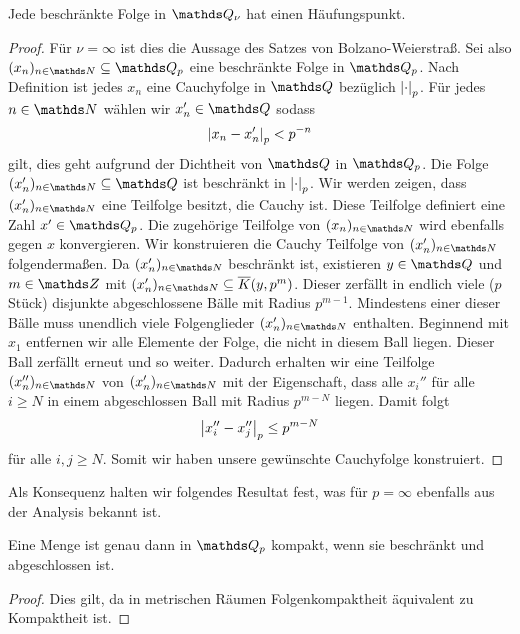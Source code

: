 \begin{thm}
Jede beschränkte Folge in $\Q_\nu$ hat einen Häufungspunkt.
\begin{proof}
Für $\nu=\infty$ ist dies die Aussage des Satzes von Bolzano-Weierstraß.
Sei also $(x_n)_{n\in \N} \subseteq \Q_p$ eine beschränkte Folge in $\Q_p$.
Nach Definition ist jedes $x_n$ eine Cauchyfolge in $\Q$ bezüglich $\left\vert\cdot\right\vert_p$.
Für jedes $n \in \N$ wählen wir $x_n' \in \Q$ sodass
\begin{align*}
\left\vert x_n-x_n'\right\vert_p<p^{-n}
\end{align*}
gilt, dies geht aufgrund der Dichtheit von $\Q$ in $\Q_p$.
Die Folge $(x_n')_{n\in \N}\subseteq \Q$ ist beschränkt in $\left\vert\cdot\right\vert_p$.
Wir werden zeigen, dass $(x_n')_{n\in \N}$ eine Teilfolge besitzt, die Cauchy ist.
Diese Teilfolge definiert eine Zahl $x'\in \Q_p$.
Die zugehörige Teilfolge von $(x_n)_{n\in \N}$ wird ebenfalls gegen $x$ konvergieren.
Wir konstruieren die Cauchy Teilfolge von $(x_n')_{n\in \N}$ folgendermaßen.
Da $(x_n')_{n \in \N}$ beschränkt ist, existieren $y \in \Q$ und $m\in \Z$ mit $(x_n')_{n\in \N}\subseteq \overline{K}(y,p^m)$. Dieser zerfällt in endlich viele ($p$ Stück) disjunkte abgeschlossene Bälle mit Radius $p^{m-1}$.
Mindestens einer dieser Bälle muss unendlich viele Folgenglieder $(x_n')_{n\in \N}$ enthalten.
Beginnend mit $x_1$ entfernen wir alle Elemente der Folge, die nicht in diesem Ball liegen.
Dieser Ball zerfällt erneut und so weiter.
Dadurch erhalten wir eine Teilfolge $(x_n'')_{n\in \N}$ von $(x_n')_{n\in \N} $ mit der Eigenschaft,
dass alle $x_i''$ für alle $i\geq N$ in einem abgeschlossen Ball
mit Radius $p^{m-N}$ liegen. Damit folgt
\begin{align*}
\left\vert x_i''-x_j''\right\vert_p\leq p^{m-N}
\end{align*}
für alle $i,j\geq N$. Somit wir haben unsere gewünschte Cauchyfolge konstruiert.
\end{proof}
\end{thm}

Als Konsequenz halten wir folgendes Resultat fest, was für $p=\infty$ ebenfalls aus der Analysis bekannt ist.

\begin{cor}
Eine Menge ist genau dann in $\Q_p$ kompakt, wenn sie beschränkt und abgeschlossen ist.
\end{cor}
\begin{proof}
Dies gilt, da in metrischen Räumen Folgenkompaktheit äquivalent zu Kompaktheit ist.
\end{proof}

